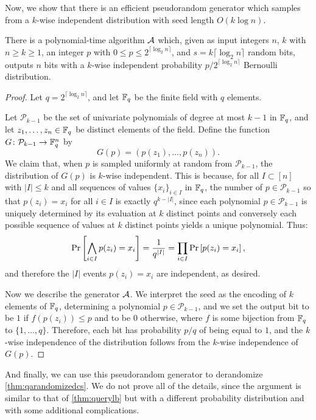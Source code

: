 Now, we show that there is an efficient pseudorandom generator which samples from a $k$-wise
independent distribution with seed length $O(k \log n)$.

\begin{theorem}
\label{thm:kwiseindepgen}
There is a polynomial-time algorithm $\mathcal{A}$ which, given as input integers $n$, $k$ with $n \geq k \geq 1$,
an integer $p$ with $0 \leq p \leq 2^{\lceil \log_2 n \rceil}$, and $s = k \lceil \log_2 n \rceil$
random bits, outputs $n$ bits with a $k$-wise independent probability $p/2^{\lceil \log_2 n \rceil}$ 
Bernoulli distribution.
\end{theorem}
\begin{proof}
Let $q = 2^{\lceil \log_2 n \rceil}$, and let $\mathbb{F}_q$ be the finite field with $q$ elements. 

Let $\mathcal{P}_{k-1}$ be the set of univariate polynomials of degree at most $k-1$ in $\mathbb{F}_q$,
and let $z_1, \ldots, z_n \in \mathbb{F}_q$ be distinct elements of the field. Define the function 
$G \colon \mathcal{P}_{k-1} \to \mathbb{F}^n_q$ by
$$
G(p) = (p(z_1), \ldots, p(z_n)).
$$
We claim that, when $p$ is sampled uniformly at random from $\mathcal{P}_{k-1}$, the distribution
of $G(p)$ is $k$-wise independent. This is because, for all $I \subset [n]$ with $|I| \leq k$ and 
all sequences of values $\{x_i\}_{i\in I}$ in $\mathbb{F}_q$, the number of $p \in \mathcal{P}_{k-1}$ so that 
$p(z_i) = x_i$ for all $i \in I$ is exactly $q^{k-|I|}$, since each polynomial $p \in \mathcal{P}_{k-1}$
is uniquely determined by its evaluation at $k$ distinct points and conversely each possible sequence 
of values at $k$ distinct points yields a unique polynomial. Thus:
$$
\text{Pr}\left[\bigwedge_{i\in I} p(z_i) = x_i\right] = \frac{1}{q^{|I|}} = \prod_{i\in I} \text{Pr}\left[p(z_i) = x_i\right],
$$
and therefore the $|I|$ events $p(z_i) = x_i$ are independent, as desired. 

Now we describe the generator $\mathcal{A}$. We interpret the seed as the encoding of $k$ elements of $\mathbb{F}_q$,
determining a polynomial $p \in \mathcal{P}_{k-1}$, and we set the output bit to be $1$ if 
$f(p(z_i)) \leq p$ and to be $0$ otherwise, where $f$ is some bijection from $\mathbb{F}_q$ to $\{1, \ldots, q\}$.
Therefore, each bit has probability $p/q$ of being equal to $1$, and the $k$-wise independence of the
distribution follows from the $k$-wise independence of $G(p)$. 
\end{proof}

And finally, we can use this pseudorandom generator to derandomize \cref{thm:qarandomizedcs}.
We do not prove all of the details, since the argument is similar to that of \cref{thm:querylb}
but with a different probability distribution and with some additional complications. 

